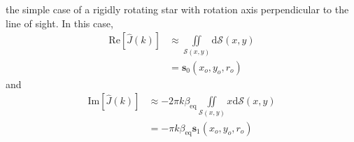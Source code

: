 \documentclass[modern]{aastex62}
\begin{document}
the simple case of a rigidly rotating star with rotation axis
perpendicular to the line of sight. In this case,
%
\begin{align}
    \mathrm{Re}\left[\hat{J}(k)\right] 
    &\approx \iint\limits_{\mathcal{S}(x, y)}\mathrm{d}\mathcal{S}(x, y)
    \nonumber \\
    &= \mathbf{s}_0(x_o, y_o, r_o)
\end{align}
%
and
%
\begin{align}
    \mathrm{Im}\left[\hat{J}(k)\right] 
    &\approx 
    -2\pi k \beta_\mathrm{eq}
    \iint\limits_{\mathcal{S}(x, y)}
    x
    \mathrm{d}\mathcal{S}(x, y)
    \nonumber \\
    &= -\pi k \beta_\mathrm{eq} \mathbf{s}_1(x_o, y_o, r_o)
\end{align}
%


\end{document}
